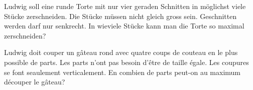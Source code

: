 Ludwig soll eine runde Torte mit nur vier geraden Schnitten in möglichst viele Stücke zerschneiden. Die Stücke müssen nicht gleich gross sein. Geschnitten werden darf nur senkrecht. In wieviele Stücke kann man die Torte so maximal zerschneiden?

\bigskip

Ludwig doit couper un gâteau rond avec quatre coups de couteau en le plus possible de parts. Les parts n'ont pas besoin d'être de taille égale. Les coupures se font seaulement verticalement. En combien de parts peut-on au maximum découper le gâteau?